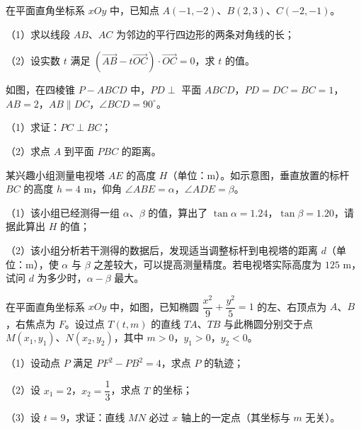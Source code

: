 \begin{question}
在平面直角坐标系 $xOy$ 中，已知点 $A(-1,-2)$、$B(2,3)$、$C(-2,-1)$。

（1）求以线段 $AB$、$AC$ 为邻边的平行四边形的两条对角线的长；

（2）设实数 $t$ 满足 $\left(\overrightarrow{AB}-t\overrightarrow{OC}\right)\cdot\overrightarrow{OC}=0$，求 $t$ 的值。

\Needspace{0.4\textheight}
\end{question}
\begingroup
\renewenvironment{question}{\Needspace{0.5\textheight}}{}
\begin{question}
如图，在四棱锥 $P-ABCD$ 中，$PD\perp$ 平面 $ABCD$，$PD=DC=BC=1$，$AB=2$，$AB\parallel DC$，$\angle BCD=90^\circ$。

（1）求证：$PC\perp BC$；

（2）求点 $A$ 到平面 $PBC$ 的距离。
\nopagebreak[4]
\begin{center}\end{center}
\nopagebreak[4]
\Needspace{0.4\textheight}
\end{question}
\endgroup
\begingroup
\renewenvironment{question}{\Needspace{0.5\textheight}}{}
\begin{question}
某兴趣小组测量电视塔 $AE$ 的高度 $H$（单位：m）。如示意图，垂直放置的标杆 $BC$ 的高度 $h=4$ m，仰角 $\angle ABE=\alpha$，$\angle ADE=\beta$。

（1）该小组已经测得一组 $\alpha$、$\beta$ 的值，算出了 $\tan\alpha=1.24$，$\tan\beta=1.20$，请据此算出 $H$ 的值；

（2）该小组分析若干测得的数据后，发现适当调整标杆到电视塔的距离 $d$（单位：m），使 $\alpha$ 与 $\beta$ 之差较大，可以提高测量精度。若电视塔实际高度为 $125$ m，试问 $d$ 为多少时，$\alpha-\beta$ 最大。
\nopagebreak[4]
\begin{center}\end{center}
\nopagebreak[4]
\Needspace{0.4\textheight}
\end{question}
\endgroup
\begingroup
\renewenvironment{question}{\Needspace{0.5\textheight}}{}
\begin{question}
在平面直角坐标系 $xOy$ 中，如图，已知椭圆 $\dfrac{x^2}{9}+\dfrac{y^2}{5}=1$ 的左、右顶点为 $A$、$B$，右焦点为 $F$。设过点 $T(t,m)$ 的直线 $TA$、$TB$ 与此椭圆分别交于点 $M(x_1,y_1)$、$N(x_2,y_2)$，其中 $m>0$，$y_1>0$，$y_2<0$。

（1）设动点 $P$ 满足 $PF^2-PB^2=4$，求点 $P$ 的轨迹；

（2）设 $x_1=2$，$x_2=\dfrac13$，求点 $T$ 的坐标；

（3）设 $t=9$，求证：直线 $MN$ 必过 $x$ 轴上的一定点（其坐标与 $m$ 无关）。
\nopagebreak[4]
\begin{center}\end{center}
\nopagebreak[4]
\end{question}
